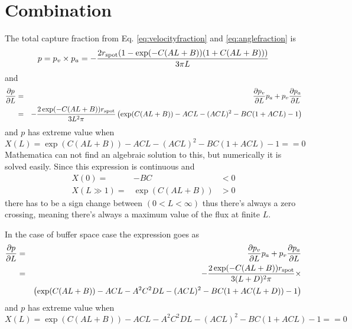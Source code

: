 \documentclass[10pt,a4paper]{article}
\begin{document}
\section{Combination}
The total capture fraction from Eq. \ref{eq:velocityfraction} and \ref{eq:anglefraction} is
\begin{equation}
p = p_v \times p_a = -\frac{2 r_{\rm spot} (1 - \exp(-C (A L + B))(1 + C (A L + B)))}{3 \pi L}
\label{eq:flux}
\end{equation}
and
\begin{eqnarray}
\frac{\partial p}{\partial L} &=& \frac{\partial p_v}{\partial L} p_a + p_v \frac{\partial p_a}{\partial L} \\
  &=&-\frac{2 \exp(-C (A L + B))  r_{\rm spot}}{3 L^2 \pi }\left(\exp(C (A L+B))-A C L - (A C L)^2-B C (1+A C L) - 1\right)
\label{eq:dflux}
\end{eqnarray}
and $p$ has extreme value when
\begin{equation}
X(L) = \exp(C (A L+B))-A C L - (A C L)^2-B C (1+A C L) - 1 == 0
\end{equation}
Mathematica can not find an algebraic solution to this, but numerically it is solved easily. Since this expression is continuous and
\begin{eqnarray}
X(0) =& -BC &< 0 \\
X(L\gg1) =& \exp(C (AL+B)) &> 0
\end{eqnarray}
there has to be a sign change between $(0 < L < \infty)$ thus there's always a zero crossing, meaning there's always a maximum value of the flux at finite $L$.


In the case of buffer space case the expression goes as
\begin{eqnarray}
\frac{\partial p}{\partial L} &=& \frac{\partial p_v}{\partial L} p_a + p_v \frac{\partial p_a}{\partial L} \\
  &=&-\frac{2 \exp(-C (A L + B))  r_{\rm spot}}{3 (L+D)^2 \pi } \times \nonumber \\
  & &\left(\exp(C (A L+B))-A C L - A^2 C^2 D L- (A C L)^2-B C (1+A C (L+D)) - 1\right)
\end{eqnarray}
and $p$ has extreme value when
\begin{equation}
X(L) = \exp(C (A L+B))-A C L - A^2 C^2 D L - (A C L)^2 - B C (1+A C L) - 1 == 0
\end{equation}
\end{document}
